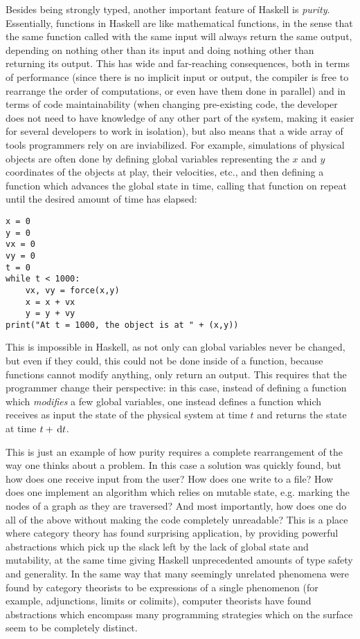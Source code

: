 \documentclass[11pt]{article}
\theoremstyle{nonumberplain}
\begin{document}
Besides being strongly typed, another important feature of Haskell is \emph{purity}. Essentially, functions in Haskell are like mathematical functions, in the sense that the same function called with the same input will always return the same output, depending on nothing other than its input and doing nothing other than returning its output. This has wide and far-reaching consequences, both in terms of performance (since there is no implicit input or output, the compiler is free to rearrange the order of computations, or even have them done in parallel) and in terms of code maintainability (when changing pre-existing code, the developer does not need to have knowledge of any other part of the system, making it easier for several developers to work in isolation), but also means that a wide array of tools programmers rely on are inviabilized. For example, simulations of physical objects are often done by defining global variables representing the $x$ and $y$ coordinates of the objects at play, their velocities, etc., and then defining a function which advances the global state in time, calling that function on repeat until the desired amount of time has elapsed:
\begin{lstlisting}
x = 0
y = 0
vx = 0
vy = 0
t = 0
while t < 1000:
	vx, vy = force(x,y)
	x = x + vx
	y = y + vy
print("At t = 1000, the object is at " + (x,y))
\end{lstlisting}

This is impossible in Haskell, as not only can global variables never be changed, but even if they could, this could not be done inside of a function, because functions cannot modify anything, only return an output. This requires that the programmer change their perspective: in this case, instead of defining a function which \emph{modifies} a few global variables, one instead defines a function which receives as input the state of the physical system at time $t$ and returns the state at time $t + \dl t$. 

This is just an example of how purity requires a complete rearrangement of the way one thinks about a problem. In this case a solution was quickly found, but how does one receive input from the user? How does one write to a file? How does one implement an algorithm which relies on mutable state, e.g. marking the nodes of a graph as they are traversed? And most importantly, how does one do all of the above without making the code completely unreadable? This is a place where category theory has found surprising application, by providing powerful abstractions which pick up the slack left by the lack of global state and mutability, at the same time giving Haskell unprecedented amounts of type safety and generality. In the same way that many seemingly unrelated phenomena were found by category theorists to be expressions of a single phenomenon (for example, adjunctions, limits or colimits), computer theorists have found abstractions which encompass many programming strategies which on the surface seem to be completely distinct.
\end{document}
